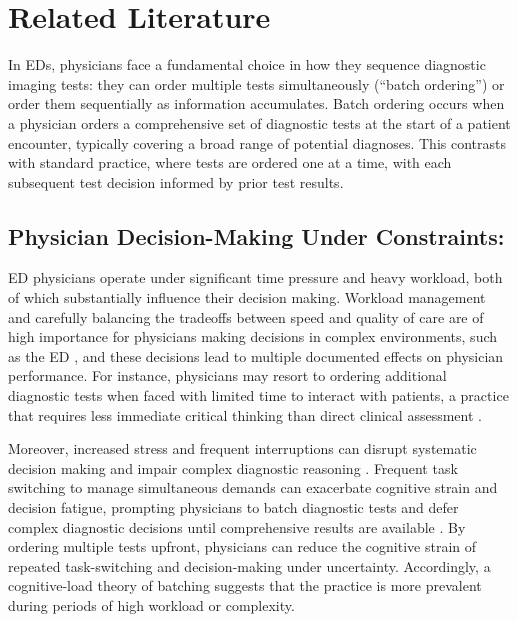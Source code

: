 \documentclass[,,blindrev]{informs}
\begin{document}
\section{Related Literature}\label{sec:lit}

In EDs, physicians face a fundamental choice in how they sequence
diagnostic imaging tests: they can order multiple tests simultaneously
(``batch ordering'') or order them sequentially as information
accumulates. Batch ordering occurs when a physician orders a
comprehensive set of diagnostic tests at the start of a patient
encounter, typically covering a broad range of potential diagnoses. This
contrasts with standard practice, where tests are ordered one at a time,
with each subsequent test decision informed by prior test results.

\subsection{Physician Decision-Making Under
Constraints:}\label{physician-decision-making-under-constraints}

ED physicians operate under significant time pressure and heavy
workload, both of which substantially influence their decision making.
Workload management and carefully balancing the tradeoffs between speed
and quality of care are of high importance for physicians making
decisions in complex environments, such as the ED
\citep[\citet{leppink2019mental}]{Saghafian2018}, and these decisions
lead to multiple documented effects on physician performance. For
instance, physicians may resort to ordering additional diagnostic tests
when faced with limited time to interact with patients, a practice that
requires less immediate critical thinking than direct clinical
assessment \citep[\citet{pines2009trends}]{batt2016early}.

Moreover, increased stress and frequent interruptions can disrupt
systematic decision making and impair complex diagnostic reasoning
\citep[\citet{bendoly2011linking}]{chisholm2000emergency}. Frequent task
switching to manage simultaneous demands can exacerbate cognitive strain
and decision fatigue, prompting physicians to batch diagnostic tests and
defer complex diagnostic decisions until comprehensive results are
available \citep[\citet{skaugset2016can},
\citet{jaeker2020value}]{kc2013does}. By ordering multiple tests
upfront, physicians can reduce the cognitive strain of repeated
task-switching and decision-making under uncertainty. Accordingly, a
cognitive-load theory of batching suggests that the practice is more
prevalent during periods of high workload or complexity.
\end{document}
